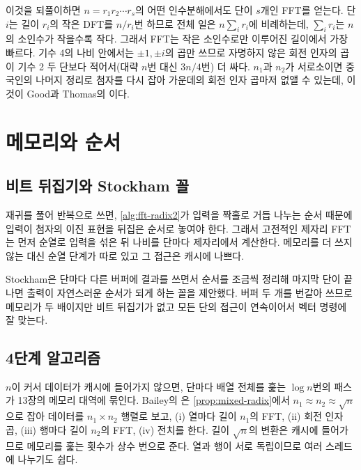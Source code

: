 이것을 되풀이하면 $n=r_1r_2\cdots r_s$의 어떤 인수분해에서도 단이 $s$개인 FFT를 얻는다. 단 $i$는 길이 $r_i$의 작은 DFT를 $n/r_i$번 하므로 전체 일은 $n\sum_ir_i$에 비례하는데, $\sum_ir_i$는 $n$의 소인수가 작을수록 작다. 그래서 FFT는 작은 소인수로만 이루어진 길이에서 가장 빠르다. 기수 4의 나비 안에서는 $\pm1,\pm i$의 곱만 쓰므로 자명하지 않은 회전 인자의 곱이 기수 2 두 단보다 적어서(대략 $n$번 대신 $3n/4$번) 더 싸다. $n_1$과 $n_2$가 서로소이면 중국인의 나머지 정리로 첨자를 다시 잡아 가운데의 회전 인자 곱마저 없앨 수 있는데, 이것이 Good과 Thomas의 이다\cite{good1958,duhamel1990}.

\section{메모리와 순서}
\label{sec:fft-memory}

\subsection{비트 뒤집기와 Stockham 꼴}

재귀를 풀어 반복으로 쓰면, \cref{alg:fft-radix2}가 입력을 짝홀로 거듭 나누는 순서 때문에 입력이 첨자의 이진 표현을 뒤집은 순서로 놓여야 한다. 그래서 고전적인 제자리 FFT는 먼저  순열로 입력을 섞은 뒤 나비를 단마다 제자리에서 계산한다. 메모리를 더 쓰지 않는 대신 순열 단계가 따로 있고 그 접근은 캐시에 나쁘다.

Stockham은 단마다 다른 버퍼에 결과를 쓰면서 순서를 조금씩 정리해 마지막 단이 끝나면 출력이 자연스러운 순서가 되게 하는 꼴을 제안했다\cite{stockham1966}. 버퍼 두 개를 번갈아 쓰므로 메모리가 두 배이지만 비트 뒤집기가 없고 모든 단의 접근이 연속이어서 벡터 명령에 잘 맞는다\cite{vanloan1992}.

\subsection{4단계 알고리즘}

$n$이 커서 데이터가 캐시에 들어가지 않으면, 단마다 배열 전체를 훑는 $\log n$번의 패스가 13장의 메모리 대역에 묶인다. Bailey의 은 \cref{prop:mixed-radix}에서 $n_1\approx n_2\approx\sqrt n$으로 잡아 데이터를 $n_1\times n_2$ 행렬로 보고, (i) 열마다 길이 $n_1$의 FFT, (ii) 회전 인자 곱, (iii) 행마다 길이 $n_2$의 FFT, (iv) 전치를 한다\cite{bailey1990fft}. 길이 $\sqrt n$의 변환은 캐시에 들어가므로 메모리를 훑는 횟수가 상수 번으로 준다. 열과 행이 서로 독립이므로 여러 스레드에 나누기도 쉽다.

